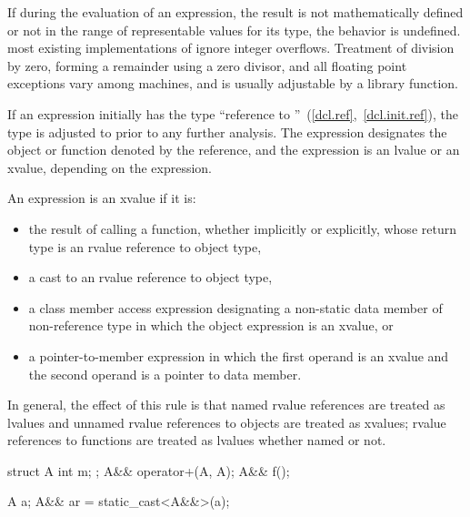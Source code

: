\pnum
{}%
%
%
%
%
If during the evaluation of an expression, the result is not
mathematically defined or not in the range of representable values for
its type, the behavior is undefined.
\enternote 
{}%
most existing implementations of \Cpp ignore integer overflows.
Treatment of division by zero, forming a remainder using a zero divisor,
and all floating point exceptions vary among machines, and is usually
adjustable by a library function.
\exitnote 

\pnum
{}%
If an expression initially has the type ``reference to
''~(\ref{dcl.ref},~\ref{dcl.init.ref}), the type is adjusted to
 prior to any further analysis. The expression designates the
object or function denoted by the reference, and the expression
is an lvalue or an xvalue, depending on the expression.

\pnum
{}%
\enternote
An expression is an xvalue if it is:
\begin{itemize}
\item the result of calling a function, whether implicitly or explicitly,
whose return type is an rvalue reference to object type,

\item a cast to an rvalue reference to object type,

\item a class member access expression designating a non-static data member
of non-reference type
in which the object expression is an xvalue, or

\item a  pointer-to-member expression in which the first operand is
an xvalue and the second operand is a pointer to data member.
\end{itemize}
In general, the effect of this rule is that named rvalue references are
treated as lvalues and unnamed rvalue references to objects are treated as
xvalues; rvalue references to functions are treated as lvalues whether named or not.
\exitnote

\enterexample
\begin{codeblock}
struct A {
  int m;
};
A&& operator+(A, A);
A&& f();

A a;
A&& ar = static_cast<A&&>(a);
\end{codeblock}

